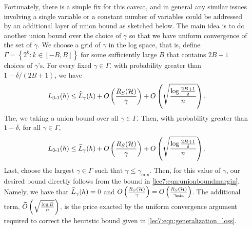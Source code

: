 Fortunately, there is a simple fix for this caveat, and in general any similar issues involving a single variable or a constant number of variables could be addressed by an additional layer of union bound as sketched below. 
The main idea is to do another union bound over the choice of $\gamma$ so that we have uniform convergence of the set of $\gamma$.  
We choose a grid of $\gamma$ in the log space, that is, define  $\Gamma = \left\{ 2^k: k \in [-B, B] \right\}$ for some sufficiently large $B$ that contains $2B+1$ choices of $\gamma$'s. 
For every fixed $\gamma \in \Gamma$, with probability greater than $1 - \delta/(2B+1)$, we have
\begin{align}
L_{\textup{0-1}}(h) \leq \widehat{L}_\gamma (h) + O \left( \frac{R_S(\mathcal H)}{\gamma} \right) + O \left( \sqrt{\frac{\log \frac{2B+1}{\delta}}{n}} \right).
\end{align}
The, we taking a union bound over all $\gamma \in \Gamma$. Then, with probability greater than $1 - \delta$, for all $\gamma \in \Gamma$, 
\begin{align}
    L_{\textup{0-1}}(h) \leq \widehat{L}_\gamma (h) + O \left( \frac{R_S(\mathcal H)}{\gamma} \right) + O \left( \sqrt{\frac{\log \frac{2B+1}{\delta}}{n}}\right). \label{lec7:eqn:unionboundmargin}
\end{align}
Last, choose the largest $\gamma \in \Gamma$ such that $\gamma \leq \gamma_{\min}$. Then, for this value of $\gamma$, our desired bound directly follows from the bound in \eqref{lec7:eqn:unionboundmargin}. Namely, we have that $\widehat{L}_{\gamma} (h) = 0$ and $O \left( \frac{R_S(\mathcal H)}{\gamma} \right) = O \left( \frac{R_S(\mathcal H)}{\gamma_{\min}} \right)$. The additional term, $\widetilde{O}\left ( \sqrt{\frac{\log B}{n} }\right )$, is the price exacted by the uniform convergence argument required to correct the heuristic bound given in \eqref{lec7:eqn:generalization_loss}.

